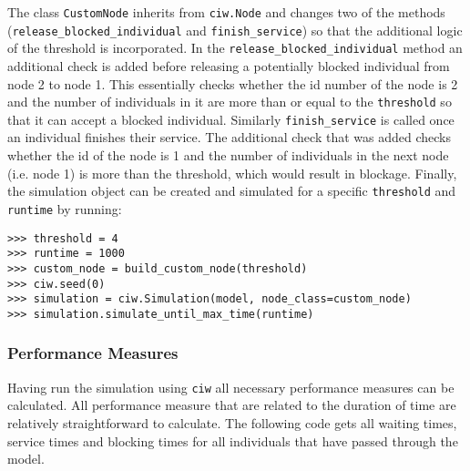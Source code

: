 The class \lstinline[style=pystyle]{CustomNode} inherits from
\lstinline[style=pystyle]{ciw.Node} and changes two of the methods
(\lstinline[style=pystyle]{release_blocked_individual} and
\lstinline[style=pystyle]{finish_service}) so that the additional logic of the
threshold is incorporated.
In the \lstinline[style=pystyle]{release_blocked_individual} method an
additional check is added before releasing a potentially blocked individual from
node 2 to node 1.
This essentially checks whether the id number of the node is 2 and
the number of individuals in it are more than or equal to the
\lstinline[style=pystyle]{threshold} so that it can accept a blocked individual.
Similarly \lstinline[style=pystyle]{finish_service} is called once an individual
finishes their service.
The additional check that was added checks whether the id of the node is 1 and
the number of individuals in the next node (i.e. node 1) is more than the
threshold, which would result in blockage.
Finally, the simulation object can be created and simulated for a specific
\lstinline[style=pystyle]{threshold} and \lstinline[style=pystyle]{runtime} by
running:

\begin{lstlisting}[style=pystyle]
>>> threshold = 4
>>> runtime = 1000
>>> custom_node = build_custom_node(threshold)
>>> ciw.seed(0)
>>> simulation = ciw.Simulation(model, node_class=custom_node)
>>> simulation.simulate_until_max_time(runtime)

\end{lstlisting}


\subsubsection{Performance Measures}

Having run the simulation using \lstinline[style=pystyle]{ciw} all necessary
performance measures can be calculated.
All performance measure that are related to the duration of time are relatively
straightforward to calculate.
The following code gets all waiting times, service times and blocking times for
all individuals that have passed through the model.

